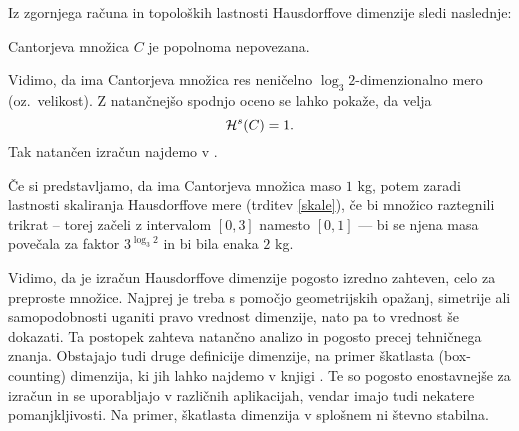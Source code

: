 Iz zgornjega računa in topoloških lastnosti Hausdorffove dimenzije sledi naslednje:
\begin{posledica}
    Cantorjeva množica \(C\) je popolnoma nepovezana.
\end{posledica}

\begin{opomba}
    Vidimo, da ima Cantorjeva množica res neničelno \(\log_3 2\)-dimenzionalno mero (oz.\ velikost). Z natančnejšo spodnjo oceno se lahko pokaže, da velja
    \[
        \mathcal{H}^s(C) = 1.
    \]
    Tak natančen izračun najdemo v \cite{pearse2014}.

    Če si predstavljamo, da ima Cantorjeva množica maso \(1\) kg, potem zaradi lastnosti skaliranja Hausdorffove mere (trditev \ref{skale}), če bi množico raztegnili trikrat -- torej začeli z intervalom \([0,3]\) namesto \([0,1]\) — bi se njena masa povečala za faktor \(3^{\log_3 2}\) in bi bila enaka \(2\) kg.
\end{opomba}

Vidimo, da je izračun Hausdorffove dimenzije pogosto izredno zahteven, celo za preproste množice. Najprej je treba s pomočjo geometrijskih opažanj, simetrije ali samopodobnosti uganiti pravo vrednost dimenzije, nato pa to vrednost še dokazati. Ta postopek zahteva natančno analizo in pogosto precej tehničnega znanja.
\newpage
Obstajajo tudi druge definicije dimenzije, na primer škatlasta (box-counting) dimenzija, ki jih lahko najdemo v knjigi \cite{fk-fg}. Te so pogosto enostavnejše za izračun in se uporabljajo v različnih aplikacijah, vendar imajo tudi nekatere pomanjkljivosti. Na primer, škatlasta dimenzija v splošnem ni števno stabilna.
